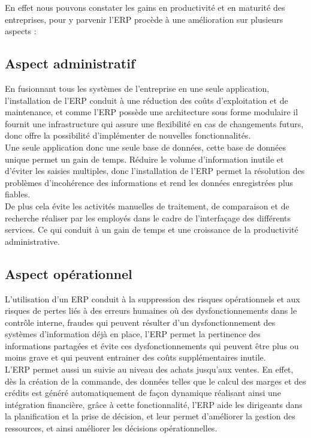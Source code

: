 En effet nous pouvons constater les gains en productivité et en maturité des entreprises, pour y parvenir l’\acs{ERP} procède à une amélioration sur plusieurs aspects :

\subsection{Aspect administratif}
En fusionnant tous les systèmes de l’entreprise en une seule application, l’installation de l’\acs{ERP} conduit à une réduction des coûts d’exploitation et de maintenance, et comme l’\acs{ERP} possède une architecture sous forme modulaire il fournit une infrastructure qui assure une flexibilité en cas de changements futurs, donc offre la possibilité d’implémenter de nouvelles fonctionnalités.\\

Une seule application donc une seule base de données, cette base de données unique permet un gain de temps. Réduire le volume d’information inutile et d’éviter les saisies multiples, donc l’installation de l’\acs{ERP} permet la résolution des problèmes d’incohérence des informations et rend les données enregistrées plus fiables.\\

De plus cela évite les activités manuelles de traitement, de comparaison et de recherche réaliser par les employés dans le cadre de l’interfaçage des différents services. Ce qui conduit à un gain de temps et une croissance de la productivité administrative.

\subsection{Aspect opérationnel}
L’utilisation d’un \acs{ERP} conduit à la suppression des risques opérationnels et aux risques de pertes liés à des erreurs humaines où des dysfonctionnements dans le contrôle interne, fraudes qui peuvent résulter d’un dysfonctionnement des systèmes d’information déjà en place, l’\acs{ERP} permet la pertinence des informations partagées et évite ces dysfonctionnements qui peuvent être plus ou moins grave et qui peuvent entrainer des coûts supplémentaires inutile.\\

L’\acs{ERP} permet aussi un suivie au niveau des achats jusqu’aux ventes. En effet, dès la création de la commande, des données telles que le calcul des marges et des crédits est généré automatiquement de façon dynamique réalisant ainsi une intégration financière, grâce à cette fonctionnalité, l’\acs{ERP} aide les dirigeants dans la planification et la prise de décision, et leur permet d’améliorer la gestion des ressources, et ainsi améliorer les décisions opérationnelles.\\

